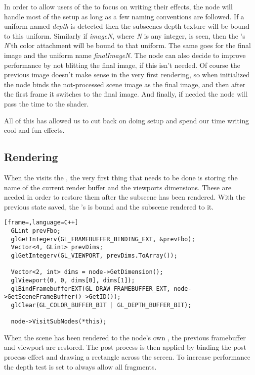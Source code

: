 In order to allow users of the  to focus on
writing their effects, the node will handle most of the setup as long
as a few naming conventions are followed. If a uniform named
\textit{depth} is detected then the subscenes depth texture will be
bound to this uniform. Similarly if \textit{imageN}, where \textit{N}
is any integer, is seen, then the 's \textit{N}'th
color attachment will be bound to that uniform. The same goes for the
final image and the uniform name \textit{finalImageN}. The node can
also decide to improve performance by not blitting the final image, if
this isn't needed. Of course the previous image doesn't make sense in
the very first rendering, so when initialized the node binds the
not-processed scene image as the final image, and then after the first
frame it switches to the final image. And finally, if needed the node
will pass the time to the shader.

All of this has allowed us to cut back on doing setup and spend our
time writing cool and fun effects.

\subsection*{Rendering}


When the  visits the , the
very first thing that needs to be done is storing the name of the
current render buffer and the viewports dimensions. These are needed
in order to restore them after the subscene has been rendered. With
the previous state saved, the 's
 is bound and the subscene rendered to it.

\begin{lstlisting}[frame=,language=C++]
  GLint prevFbo;
  glGetIntegerv(GL_FRAMEBUFFER_BINDING_EXT, &prevFbo);
  Vector<4, GLint> prevDims;
  glGetIntegerv(GL_VIEWPORT, prevDims.ToArray());
  
  Vector<2, int> dims = node->GetDimension();
  glViewport(0, 0, dims[0], dims[1]);
  glBindFramebufferEXT(GL_DRAW_FRAMEBUFFER_EXT, node->GetSceneFrameBuffer()->GetID());
  glClear(GL_COLOR_BUFFER_BIT | GL_DEPTH_BUFFER_BIT);
  
  node->VisitSubNodes(*this);
\end{lstlisting}


When the scene has been rendered to the node's own
, the previous framebuffer and viewport are
restored. The post process is then applied by binding the post process
effect and drawing a rectangle across the screen. To increase
performance the depth test is set to always allow all fragments.

